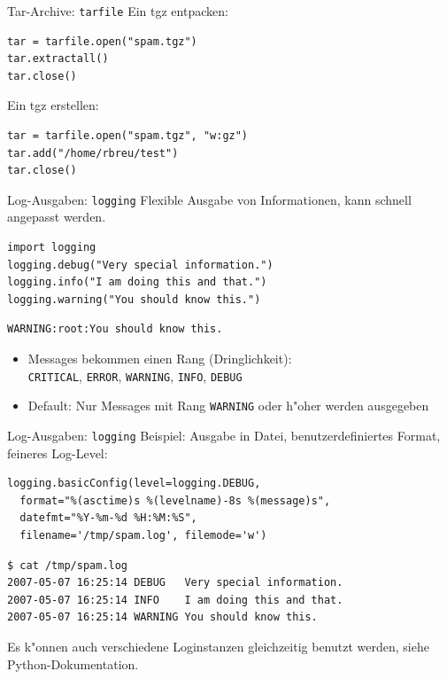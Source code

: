 \begin{frame}[fragile]{Tar-Archive: \texttt{tarfile}}
Ein tgz entpacken:
\begin{lstlisting}[style=Python]
tar = tarfile.open("spam.tgz")
tar.extractall()
tar.close()
\end{lstlisting}
\vspace*{3mm}
Ein tgz erstellen:
\begin{lstlisting}[style=Python]
tar = tarfile.open("spam.tgz", "w:gz")
tar.add("/home/rbreu/test")
tar.close()
\end{lstlisting}
\end{frame}

\begin{frame}[fragile]{Log-Ausgaben: \texttt{logging}}
Flexible Ausgabe von Informationen, kann schnell angepasst werden.
\begin{lstlisting}[style=Python]
import logging
logging.debug("Very special information.")
logging.info("I am doing this and that.")
logging.warning("You should know this.")
\end{lstlisting}
\begin{lstlisting}[style=shell]
WARNING:root:You should know this.
\end{lstlisting}
\begin{itemize}
\item Messages bekommen einen Rang (Dringlichkeit):\\
 \texttt{CRITICAL}, \texttt{ERROR}, \texttt{WARNING}, \texttt{INFO}, \texttt{DEBUG}
\item Default: Nur Messages mit Rang \texttt{WARNING} oder h"oher werden ausgegeben
\end{itemize}
\end{frame}

\begin{frame}[fragile]{Log-Ausgaben: \texttt{logging}}
Beispiel: Ausgabe in Datei, benutzerdefiniertes Format, feineres Log-Level:
\begin{lstlisting}[style=Python, basicstyle=\ttfamily\small]
logging.basicConfig(level=logging.DEBUG,
  format="%(asctime)s %(levelname)-8s %(message)s",
  datefmt="%Y-%m-%d %H:%M:%S",
  filename='/tmp/spam.log', filemode='w')
\end{lstlisting}
\begin{lstlisting}[style=Shell, basicstyle=\ttfamily\small]
$ cat /tmp/spam.log
2007-05-07 16:25:14 DEBUG   Very special information.
2007-05-07 16:25:14 INFO    I am doing this and that.
2007-05-07 16:25:14 WARNING You should know this.
\end{lstlisting} %
Es k"onnen auch verschiedene Loginstanzen gleichzeitig benutzt werden,
siehe Python-Dokumentation.
\end{frame}

